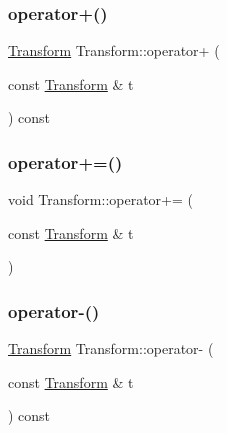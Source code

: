 \mbox{\label{class_transform_a8e21c258146adde8ca798878bab9ce9d}} 
\subsubsection{\texorpdfstring{operator+()}{operator+()}}
{\footnotesize\ttfamily \mbox{\hyperlink{class_transform}{Transform}} Transform\+::operator+ (\begin{DoxyParamCaption}\item[{const \mbox{\hyperlink{class_transform}{Transform}} \&}]{t }\end{DoxyParamCaption}) const}

\mbox{\label{class_transform_a3b0aa54a1ca373ec3a7052977b5bf826}} 
\subsubsection{\texorpdfstring{operator+=()}{operator+=()}}
{\footnotesize\ttfamily void Transform\+::operator+= (\begin{DoxyParamCaption}\item[{const \mbox{\hyperlink{class_transform}{Transform}} \&}]{t }\end{DoxyParamCaption})}

\mbox{\label{class_transform_a17493155309aa1650de99ce384f096a6}} 
\subsubsection{\texorpdfstring{operator-\/()}{operator-()}}
{\footnotesize\ttfamily \mbox{\hyperlink{class_transform}{Transform}} Transform\+::operator-\/ (\begin{DoxyParamCaption}\item[{const \mbox{\hyperlink{class_transform}{Transform}} \&}]{t }\end{DoxyParamCaption}) const}

\mbox{\label{class_transform_a204ee3471c1d08188076e3645c9f3517}} 
